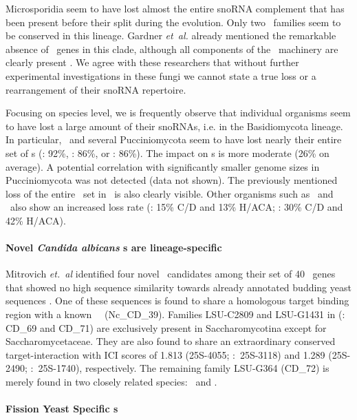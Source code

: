 Microsporidia seem to have lost almost the entire snoRNA complement
that has been present before their split during the evolution.  Only
two \cd\ families seem to be conserved in this lineage.  Gardner
\emph{et~al.} already mentioned the remarkable absence of \sno\ genes
in this clade, although all components of the \sno\ machinery are
clearly present \cite{Gardner:2010}.  We agree with these researchers
that without further experimental investigations in these fungi we
cannot state a true loss or a rearrangement of their snoRNA
repertoire.

Focusing on species level, we is frequently observe that individual
organisms seem to have lost a large amount of their snoRNAs, i.e. in
the Basidiomycota lineage.  In particular, \wse\ and several
Pucciniomycota seem to have lost nearly their entire set of \haca s
(\wse: 92\%, \rmi: 86\%, or \sli: 86\%). The impact on \cd s is more
moderate (26\% on average). A potential correlation with significantly
smaller genome sizes in Pucciniomycota was not detected (data not
shown). The previously mentioned loss of the entire \haca\ set in
\Ptt\ is also clearly visible. Other organisms such as \pan\ and \opi\
also show an increased loss rate (\pan: 15\% C/D and 13\% H/ACA; \opi:
30\% C/D and 42\% H/ACA).

\paragraph{\textbf{Novel \emph{Candida albicans} \sno s are lineage-specific}}

Mitrovich \emph{et.~al} identified four novel \sno\ candidates among
their set of 40 \sno\ genes that showed no high sequence similarity
towards already annotated budding yeast sequences
\cite{Mitrovich:2010}. One of these sequences is found to share a
homologous target binding region with a known \ncr\ \sno\
(Nc\_CD\_39). Families LSU-C2809 and LSU-G1431 in
\cite{Mitrovich:2010} (\snostrip: CD\_69 and CD\_71) are exclusively
present in Saccharomycotina except for Saccharomycetaceae. They are
also found to share an extraordinary conserved target-interaction with
ICI scores of 1.813 (25S-4055; \calb:~25S-3118) and 1.289 (25S-2490;
\calb:~25S-1740), respectively. The remaining family LSU-G364 (CD\_72)
is merely found in two closely related species: \cdu\ and \ctr.

\paragraph{\textbf{Fission Yeast Specific \sno s}}

